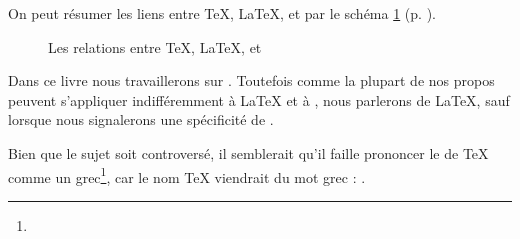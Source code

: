 On peut résumer les liens entre \TeX{}, \LaTeX{}, \XeTeX{} et \XeLaTeX{} par le schéma \ref{sch:tex} (p. \pageref{sch:tex}).

\begin{figure}[ht]
\centering

\caption{Les relations entre \TeX{}, \LaTeX{}, \XeTeX{} et \XeLaTeX{}}\label{sch:tex}
\end{figure} 

Dans  ce livre nous travaillerons sur \XeLaTeX{}. Toutefois comme la plupart de nos propos peuvent s'appliquer indifféremment  à \LaTeX{} et à \XeLaTeX{}, nous parlerons de \LaTeX{}, sauf lorsque nous signalerons une spécificité de \XeLaTeX{}.

\begin{anedocte}
Bien que le sujet soit controversé, il semblerait qu'il faille prononcer le   de \TeX{} comme un  grec\footnote{}, car le nom \TeX{} viendrait du mot grec  : .
\end{anedocte}
